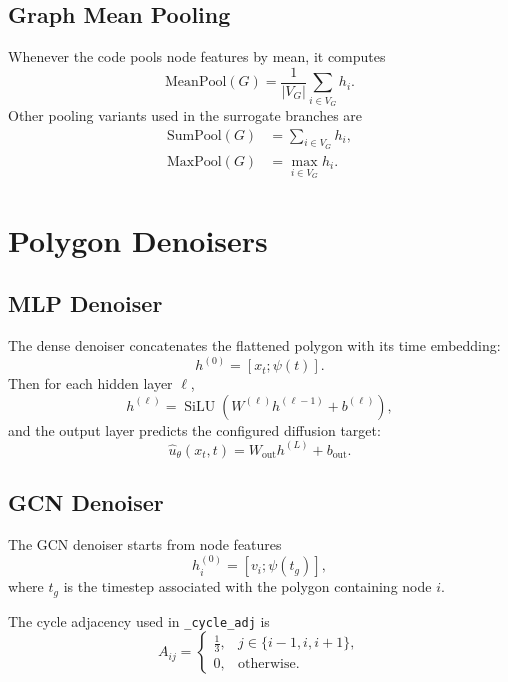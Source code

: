 \documentclass[11pt]{article}
\newcommand{\SiLU}{\operatorname{SiLU}}
\begin{document}
\subsection{Graph Mean Pooling}
Whenever the code pools node features by mean, it computes
\begin{equation}
\mathrm{MeanPool}(G)
=
\frac{1}{|V_G|}
\sum_{i \in V_G} h_i.
\end{equation}
Other pooling variants used in the surrogate branches are
\begin{align}
\mathrm{SumPool}(G) &= \sum_{i \in V_G} h_i, \\
\mathrm{MaxPool}(G) &= \max_{i \in V_G} h_i.
\end{align}

\section{Polygon Denoisers}
\subsection{MLP Denoiser}
The dense denoiser concatenates the flattened polygon with its time embedding:
\begin{equation}
h^{(0)} = [x_t ; \psi(t)].
\end{equation}
Then for each hidden layer $\ell$,
\begin{equation}
h^{(\ell)} = \SiLU\!\left(W^{(\ell)} h^{(\ell-1)} + b^{(\ell)}\right),
\end{equation}
and the output layer predicts the configured diffusion target:
\begin{equation}
\hat{u}_\theta(x_t,t) = W_{\mathrm{out}} h^{(L)} + b_{\mathrm{out}}.
\end{equation}

\subsection{GCN Denoiser}
The GCN denoiser starts from node features
\begin{equation}
h_i^{(0)} = [v_i ; \psi(t_g)],
\end{equation}
where $t_g$ is the timestep associated with the polygon containing node $i$.

The cycle adjacency used in \texttt{\_cycle\_adj} is
\begin{equation}
A_{ij} =
\begin{cases}
\frac{1}{3}, & j \in \{i-1, i, i+1\}, \\
0, & \text{otherwise}.
\end{cases}
\end{equation}
\end{document}
